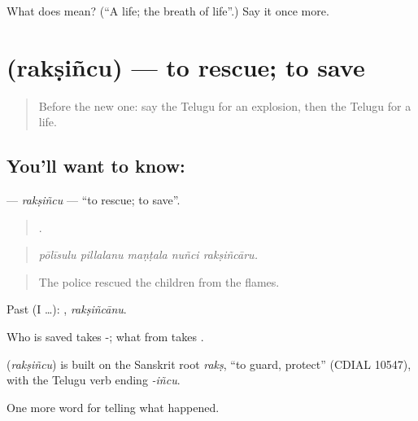 \begin{tcolorbox}[breakable,colback=teal!4,colframe=teal!35!black,title={Before you move on}]
What does  mean? (\textquotedblleft{}A life; the breath of life\textquotedblright{}.) Say it once more.
\end{tcolorbox}
\section[\texorpdfstring{\te{రక్షించు} (rakṣiñcu)}{రక్షించు (rakṣiñcu)}]{ (rakṣiñcu) — to rescue; to save}

\label{lesson:TE-C331-raksincu}



\begin{quote}
Before the new one: say the Telugu for an explosion, then the Telugu for a life.
\end{quote}

\subsection*{You'll want to know: }
\textbf{} — \emph{rakṣiñcu} — \textquotedblleft{}to rescue; to save\textquotedblright{}.

\begin{quote}
    .
\end{quote}

\begin{quote}
\emph{pōlīsulu pillalanu maṇṭala nuñci rakṣiñcāru.}
\end{quote}

\begin{quote}
The police rescued the children from the flames.
\end{quote}

Past (I …): , \emph{rakṣiñcānu}.

Who is saved takes -; what from takes .

\begin{cousinweb}
\textbf{} (\emph{rakṣiñcu}) is built on the Sanskrit root \emph{rakṣ}, \textquotedblleft{}to guard, protect\textquotedblright{} (CDIAL 10547), with the Telugu verb ending \emph{-iñcu}.
\end{cousinweb}

\begin{grammarlens}[title={What you've built}]
One more word for telling what happened.
\end{grammarlens}

